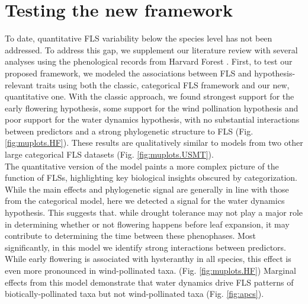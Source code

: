 \documentclass{article}
\begin{document}
\section*{Testing the new framework}

To date, quantitative FLS variability below the species level has not been addressed. To address this gap, we supplement our literature review with several analyses using the phenological records from Harvard Forest \citep{OKeefe2015}. First, to test our proposed framework, we modeled the associations between FLS and hypothesis-relevant traits using both the classic, categorical FLS framework and our new, quantitative one. With the classic approach, we found strongest support for the early flowering hypothesis, some support for the wind pollination hypothesis and poor support for the water dynamics hypothesis, with no substantial interactions between predictors and a strong phylogenetic structure to FLS (Fig. \ref{fig:muplots.HF}). These results are qualitatively similar to models from two other large categorical FLS datasets (Fig. \ref{fig:muplots.USMT}). \\

\noindent The quantitative version of the model paints a more complex picture of the function of FLSs, highlighting key biological insights obscured by categorization. While the main effects and phylogenetic signal are generally in line with those from the categorical model, here we detected a signal for the water dynamics hypothesis. This suggests that. while drought tolerance may not play a major role in determining whether or not flowering happens before leaf expansion, it may contribute to determining the time between these phenophases. Most significantly, in this model we identify strong interactions between predictors. While early flowering is associated with hysteranthy in all species, this effect is even more pronounced in wind-pollinated taxa. (Fig. \ref{fig:muplots.HF}) Marginal effects from this model demonstrate that water dynamics drive FLS patterns of biotically-pollinated taxa but not wind-pollinated taxa (Fig. \ref{fig:apcs}). \\ %
\end{document}
